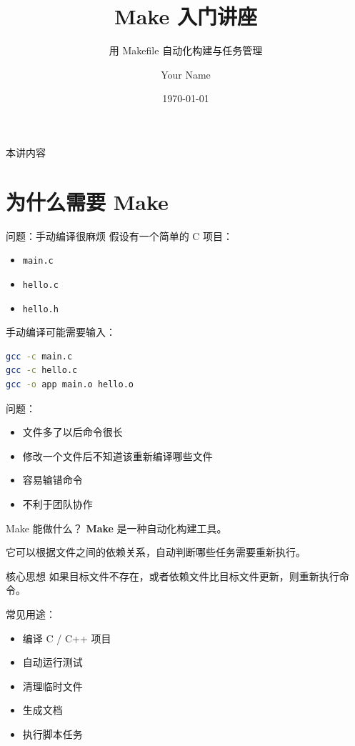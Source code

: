 \documentclass[aspectratio=169]{ctexbeamer}
\title{Make 入门讲座}
\subtitle{用 Makefile 自动化构建与任务管理}
\author{Your Name}
\date{\today}
\begin{document}
\begin{frame}
  \titlepage
\end{frame}

\begin{frame}{本讲内容}
  \tableofcontents
\end{frame}

\section{为什么需要 Make}

\begin{frame}[fragile]{问题：手动编译很麻烦}
假设有一个简单的 C 项目：

\begin{itemize}
  \item \texttt{main.c}
  \item \texttt{hello.c}
  \item \texttt{hello.h}
\end{itemize}

手动编译可能需要输入：

\begin{lstlisting}[language=bash]
gcc -c main.c
gcc -c hello.c
gcc -o app main.o hello.o
\end{lstlisting}

问题：

\begin{itemize}
  \item 文件多了以后命令很长
  \item 修改一个文件后不知道该重新编译哪些文件
  \item 容易输错命令
  \item 不利于团队协作
\end{itemize}
\end{frame}

\begin{frame}{Make 能做什么？}
\textbf{Make} 是一种自动化构建工具。

它可以根据文件之间的依赖关系，自动判断哪些任务需要重新执行。

\begin{block}{核心思想}
如果目标文件不存在，或者依赖文件比目标文件更新，则重新执行命令。
\end{block}

常见用途：

\begin{itemize}
  \item 编译 C / C++ 项目
  \item 自动运行测试
  \item 清理临时文件
  \item 生成文档
  \item 执行脚本任务
\end{itemize}
\end{frame}
\end{document}
